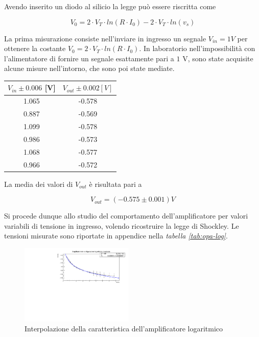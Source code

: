 \documentclass[journal]{IEEEtran}
\begin{document}
Avendo inserito un diodo al silicio la legge può essere riscritta come 

\begin{equation}
V_0 = 2 \cdot V_T \cdot ln(R \cdot I_0) - 2 \cdot V_T \cdot ln(v_s)
\end{equation}

La prima misurazione consiste nell'inviare in ingresso un segnale $V_{in} = 1V$ per ottenere la costante  $V_0 = 2 \cdot V_T \cdot ln(R \cdot I_0)$.
In laboratorio nell'impossibilità con l'alimentatore di fornire un segnale esattamente pari a $1$ V, sono state acquisite alcune misure nell'intorno, che sono poi state mediate.

\begin{center}
\begin{tabular}{|c|c|}
\hline
$V_{in} \pm 0.006 $ [V] & $V_{out} \pm 0.002 [V]$   \\ \hline
1.065 & -0.578 \\ \hline
0.887 & -0.569 \\ \hline
1.099 & -0.578 \\ \hline
0.986 & -0.573 \\ \hline
1.068 & -0.577 \\ \hline
0.966 & -0.572 \\ \hline
\end{tabular}
\end{center}

La media dei valori di $V_{out}$ è risultata pari a 

\[V_{out} = (-0.575 \pm 0.001 )V\]

Si procede dunque allo studio del comportamento dell'amplificatore per valori variabili di tensione in ingresso, volendo ricostruire la legge di Shockley. Le tensioni misurate sono riportate in appendice nella \textit{tabella \ref{tab:opa-log}}.

\begin{figure}[H]%
\begin {center}
\includegraphics[width=0.48\textwidth]{analysis/output/fit_log_vout_vin.pdf}
\caption{Interpolazione della caratteristica dell'amplificatore logaritmico}
\label{fig:log_ampl_fit}
\end {center}
\end{figure}
\end{document}
